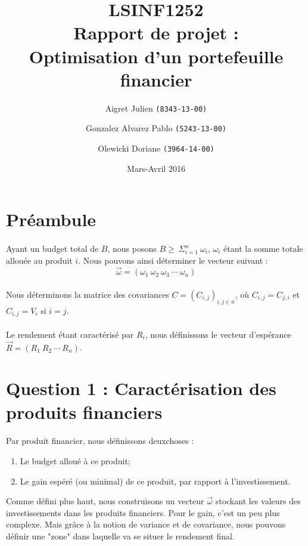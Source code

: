 \documentclass[10pt,a4paper,draft]{article}
\author{Aigret Julien \texttt{(8343-13-00)}\and Gonzalez Alvarez Pablo \texttt{(5243-13-00)}\and Olewicki Doriane \texttt{(3964-14-00)}}
\date{Mars-Avril 2016}
\title{LSINF1252\\Rapport de projet :\\Optimisation d'un portefeuille financier}
\begin{document}
\maketitle
\tableofcontents

\section*{Préambule}
\paragraph{} Ayant un budget total de $B$, nous posons $B \geq\ \Sigma_{i=1}^{n}\ \omega_i$, $\omega_i$ étant la somme totale allouée au produit $i$. Nous pouvons ainsi déterminer le vecteur suivant : $$\vec{\omega} = (\omega_1\ \omega_2\ \omega_3\ \cdots\ \omega_n)$$
\paragraph{} Nous déterminons la matrice des covariances $C = (C_{i,j})_{i,j\in \overline{n}}$, où $C_{i,j} = C_{j,i}$ et $C_{i,j} = V_i$ si $i=j$.
\paragraph{} Le rendement étant caractérisé par $R_i$, nous définissons le vecteur d'espérance $\vec{R}=(R_1\ R_2\ \cdots\ R_n)$.

\section{Question 1 : Caractérisation des produits financiers}
\paragraph{} Par produit financier, nous définissons deuxchoses :
\begin{enumerate}
\item Le budget alloué à ce produit;
\item Le gain espéré (ou minimal) de ce produit, par rapport à l'investissement.
\end{enumerate}
Comme défini plus haut, nous construisons un vecteur $\vec{\omega}$ stockant les valeurs des investissements dans les produits financiers.
Pour le gain, c'est un peu plus complexe. Mais grâce à la notion de variance et de covariance, nous pouvons définir une "zone" dans laquelle va se situer le rendement final.
\end{document}
